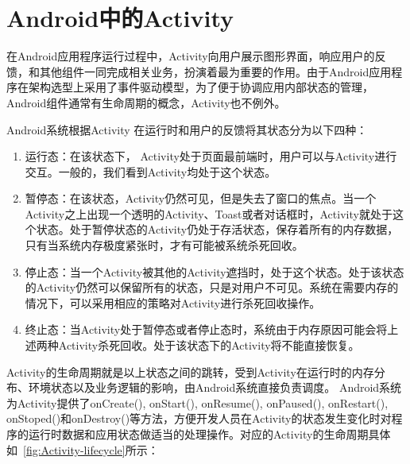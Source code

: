 \section{Android中的Activity}

在Android应用程序运行过程中，Activity向用户展示图形界面，响应用户的反馈，和其他组件一同完成相关业务，扮演着最为重要的作用。由于Android应用程序在架构选型上采用了事件驱动模型，为了便于协调应用内部状态的管理，Android组件通常有生命周期的概念，Activity也不例外。

Android系统根据Activity 在运行时和用户的反馈将其状态分为以下四种：
\begin{enumerate}
	
	\item 运行态：在该状态下， Activity处于页面最前端时，用户可以与Activity进行交互。一般的，我们看到Activity均处于这个状态。
	
	\item 暂停态：在该状态，Activity仍然可见，但是失去了窗口的焦点。当一个Activity之上出现一个透明的Activity、Toast或者对话框时，Activity就处于这个状态。处于暂停状态的Activity仍处于存活状态，保存着所有的内存数据，只有当系统内存极度紧张时，才有可能被系统杀死回收。
	
	\item 停止态：当一个Activity被其他的Activity遮挡时，处于这个状态。处于该状态的Activity仍然可以保留所有的状态，只是对用户不可见。系统在需要内存的情况下，可以采用相应的策略对Activity进行杀死回收操作。
	
	\item 终止态：当Activity处于暂停态或者停止态时，系统由于内存原因可能会将上述两种Activity杀死回收。处于该状态下的Activity将不能直接恢复。
\end{enumerate}

Activity的生命周期就是以上状态之间的跳转，受到Activity在运行时的内存分布、环境状态以及业务逻辑的影响，由Android系统直接负责调度。
Android系统为Activity提供了onCreate(), onStart(), onResume(), onPaused(), onRestart(),  onStoped()和onDestroy()等方法，方便开发人员在Activity的状态发生变化时对程序的运行时数据和应用状态做适当的处理操作。对应的Activity的生命周期具体如~\autoref{fig:Activity-lifecycle}所示：


